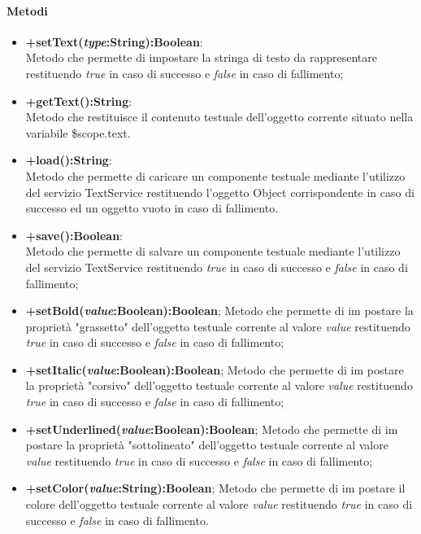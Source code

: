 	\paragraph{Metodi}
	\begin{itemize}
	\item \textbf{+setText(\textit{type}:String):Boolean}:\\
		Metodo che permette di impostare la stringa di testo da rappresentare restituendo \textit{true} in caso di successo e \textit{false} in caso di fallimento;
	\item \textbf{+getText():String}:\\
		Metodo che restituisce il contenuto testuale dell'oggetto corrente situato nella variabile \$scope.text.
	\item \textbf{+load():String}:\\	
		Metodo che permette di caricare un componente testuale mediante l'utilizzo del servizio TextService restituendo l'oggetto Object corrispondente in caso di successo ed un oggetto vuoto in caso di fallimento.	
	\item \textbf{+save():Boolean}:\\	
		Metodo che permette di salvare un componente testuale mediante l'utilizzo del servizio TextService restituendo \textit{true} in caso di successo e \textit{false} in caso di fallimento;
	\item \textbf{+setBold(\textit{value}:Boolean):Boolean};
		Metodo che permette di im postare la proprietà "grassetto" dell'oggetto testuale corrente al valore \textit{value} restituendo \textit{true} in caso di successo e \textit{false} in caso di fallimento;
	\item \textbf{+setItalic(\textit{value}:Boolean):Boolean};
		Metodo che permette di im postare la proprietà "corsivo" dell'oggetto testuale corrente al valore \textit{value} restituendo \textit{true} in caso di successo e \textit{false} in caso di fallimento;
	\item \textbf{+setUnderlined(\textit{value}:Boolean):Boolean};
		Metodo che permette di im postare la proprietà "sottolineato" dell'oggetto testuale corrente al valore \textit{value} restituendo \textit{true} in caso di successo e \textit{false} in caso di fallimento;
	\item \textbf{+setColor(\textit{value}:String):Boolean};
			Metodo che permette di im postare il colore dell'oggetto testuale corrente al valore \textit{value} restituendo \textit{true} in caso di successo e \textit{false} in caso di fallimento.
	
	\end{itemize}
